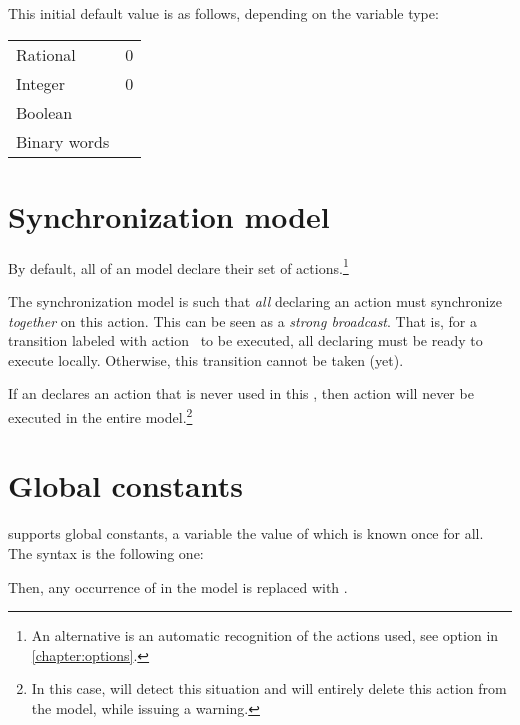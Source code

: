 This initial default value is as follows, depending on the variable type:

\begin{tabular}{l l}
	Rational & 0\\
	Integer & 0\\
	Boolean & \BFalse{}\\
	Binary words & \styleIMI{0b0}\\
\end{tabular}




\section{Synchronization model}\label{sect:synchronization}

By default, all \IPTA{} of an \imitator{} model declare their set of actions.\footnote{%
	An alternative is an automatic recognition of the actions used, see option  in \cref{chapter:options}.
}

The \imitator{} synchronization model is such that \emph{all} \IPTA{} declaring an action must synchronize \emph{together} on this action.
This can be seen as a \emph{strong broadcast}.
That is, for a transition labeled with action~ to be executed, all \IPTA{} declaring  must be ready to execute  locally.
Otherwise, this transition cannot be taken (yet).

If an \IPTA{} declares an action  that is never used in this \IPTA{}, then action  will never be executed in the entire model.\footnote{%
	In this case, \imitator{} will detect this situation and will entirely delete this action from the model, while issuing a warning.
}

\section{Global constants}

\imitator{} supports global constants, \ie{} a variable the value of which is known once for all.
The syntax is the following one:
\begin{center}
\end{center}
Then, any occurrence of  in the model is replaced with .

